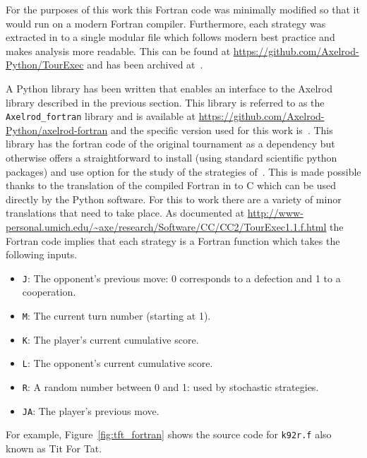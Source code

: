 \documentclass{article}
\begin{document}
For the purposes of this work this Fortran code was minimally modified so that
it would run on a modern Fortran compiler.
Furthermore, each strategy was extracted in to a single modular file which
follows modern best practice and makes analysis more readable. This can be found
at \url{https://github.com/Axelrod-Python/TourExec} and has been archived
at~\cite{TourExec}.

A Python library has been written that enables an interface to
the Axelrod library described in the previous section. This library is referred
to as the \texttt{Axelrod\_fortran} library and is available
at \url{https://github.com/Axelrod-Python/axelrod-fortran} and the specific
version used for this work is~\cite{Axelrod_fortran}.
This library has the fortran code of the original tournament as a dependency but
otherwise offers a straightforward to install (using standard scientific python
packages) and use option for the study of
the strategies of~\cite{Axelrod1980b}.
This is made possible thanks to the translation of the compiled Fortran in to C
which can be used directly by the Python software.
For this to work there are a variety of minor translations that need to take
place. As documented at
\url{http://www-personal.umich.edu/~axe/research/Software/CC/CC2/TourExec1.1.f.html}
the Fortran code implies that each strategy is a Fortran function which takes
the following inputs.

\begin{itemize}
    \item  \texttt{J}: The opponent's previous move: 0 corresponds to a
        defection and 1 to a cooperation.
    \item \texttt{M}: The current turn number (starting at 1).
    \item \texttt{K}: The player's current cumulative score.
    \item \texttt{L}: The opponent's current cumulative score.
    \item \texttt{R}: A random number between 0 and 1: used by stochastic
        strategies.
    \item \texttt{JA}: The player's previous move.
\end{itemize}

For example, Figure~\ref{fig:tft_fortran} shows the source code for
\texttt{k92r.f} also known as Tit For Tat.
\end{document}
